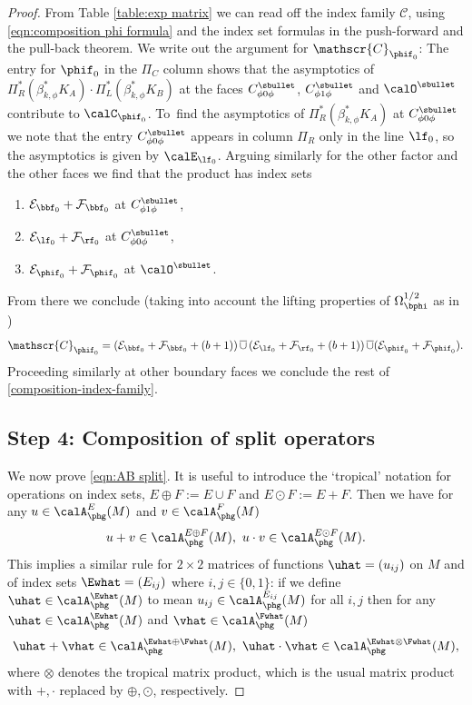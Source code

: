 \begin{proof}
From Table \ref{table:exp matrix} we can read off the index family $\mathscr{C}$, using \eqref{eqn:composition phi formula} and the index set formulas in the push-forward and the pull-back theorem. We write out the argument for $\mathscr{C}_{\phif_0}$:
The entry for $\phif_0$ in the $\Pi_C$ column shows that the asymptotics of $ \Pi_{R}^{*}(\beta_{k,\phi}^* K_{A}) \cdot
\Pi_{L}^{*}(\beta_{k,\phi}^* K_{B})$ at the faces $C_{\phi0\phi}^\sbullet$, $C_{\phi1\phi}^\sbullet$ and $\calO^\sbullet$ contribute to $\calC_{\phif_0}$.
To~find the asymptotics of $\Pi_{R}^{*}(\beta_{k,\phi}^* K_{A})$ at
$C_{\phi0\phi}^\sbullet$ we note that the entry $C_{\phi0\phi}^\sbullet$ appears in column $\Pi_R$ only in the line $\lf_0$, so the asymptotics is given by $\calE_{\lf_0}$. Arguing similarly for the other factor and the other faces we find that the product has index sets
\begin{enumerate}
\item $\mathcal{E}_{\bbf_0} + \mathcal{F}_{\bbf_0}$ at $C_{\phi1\phi}^\sbullet$,
\item $\mathcal{E}_{\lf_0} + \mathcal{F}_{\rf_0}$ at $C_{\phi0\phi}^\sbullet$,
\item $\mathcal{E}_{\phif_0} + \mathcal{F}_{\phif_0}$ at $\calO^\sbullet$.
\end{enumerate}
From there we conclude (taking into account the
lifting properties of $\Omega_{\bphi}^{1/2} $ as in \cite[Th.\,9]{grieser-para})
\[
\mathscr{C}_{\phif_0} = \left(\mathcal{E}_{\bbf_0} + \mathcal{F}_{\bbf_0} + (b+1)\right)
\overline{\cup} \left(\mathcal{E}_{\lf_0} + \mathcal{F}_{\rf_0} + (b+1)\right)
\overline{\cup}(\mathcal{E}_{\phif_0} + \mathcal{F}_{\phif_0}).
\]
Proceeding similarly at other boundary faces we conclude the rest of \eqref{composition-index-family}.

\subsection*{Step 4: Composition of split operators}
We now prove \eqref{eqn:AB split}.
It is useful to intro\-duce the `tropical' notation for operations on index sets, $E\oplus F:=E \cup F$ and \hbox{$E\odot F:= E+F$}. Then we have for any $ u\in \calA^E_{\phg}(M)$ and $v\in \calA^F_{\phg}(M)$
\[
u+v\in\calA^{E\oplus F}_{\phg}(M),\
u\cdot v \in \calA^{E\odot F}_{\phg}(M).
\]
This implies a similar rule for $2\times2$ matrices of functions $\uhat=(u_{ij})$ on $M$ and of index sets $\Ewhat=(E_{ij})$ where $i,j\in\{0,1\}$: if we define $\uhat\in\calA^\Ewhat_{\phg}(M)$ to mean
$u_{ij}\in\calA^{E_{ij}}_{\phg}(M)$ for all $i,j$ then for any
$\uhat\in \calA^\Ewhat_{\phg}(M)$ and $\vhat\in \calA^\Fwhat_{\phg}(M)$
\[
\uhat+\vhat\in\calA^{\Ewhat\oplus \Fwhat}_{\phg}(M),\
\uhat\cdot\vhat \in \calA^{\Ewhat\otimes \Fwhat}_{\phg}(M),
\]
where $\otimes$ denotes the tropical matrix product, which is the usual matrix product with
$+,\cdot$ replaced by $\oplus,\odot$, respectively.


\end{proof}
